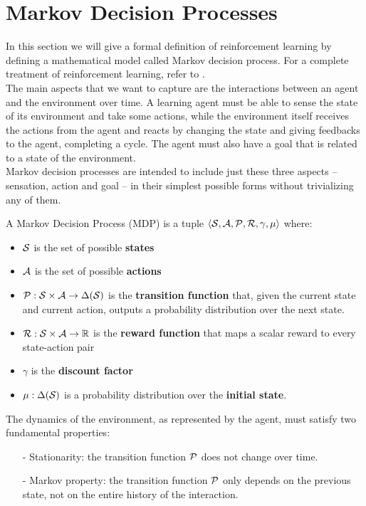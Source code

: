 \section{Markov Decision Processes}
\label{sec:mdp}
In this section we will give a formal definition of reinforcement learning by defining a mathematical model called Markov decision process. For a complete treatment of reinforcement learning, refer to \cite{sutton1998reinforcement}.\\
The main aspects that we want to capture are the interactions between an agent and the environment over time. A learning agent must be able to sense the state of its environment and take some actions, while the environment itself receives the actions from the agent and reacts by changing the state and giving feedbacks to the agent, completing a cycle.
The agent must also have a goal that is related to a state of the environment.\\
Markov decision processes are intended to include just these three aspects -- sensation, action and goal -- in their simplest possible forms without trivializing any of them.
\newpage
\begin{definition}
A Markov Decision Process (MDP) is a tuple $\left\langle \mathcal{S}, \mathcal{A}, \mathcal{P}, \mathcal{R}, \gamma, \mu \right\rangle$  where:
\begin{itemize}
\item $\mathcal{S}$ is the set of possible \textbf{states}
\item $\mathcal{A}$ is the set of possible \textbf{actions}
\item $\mathcal{P} : \mathcal{S} \times \mathcal{A} \rightarrow \Delta (\mathcal{S})$ is the \textbf{transition function} that, given the current state and current action, outputs a probability distribution over the next state.
\item $\mathcal{R} : \mathcal{S} \times \mathcal{A} \rightarrow \mathbb{R}$ is the \textbf{reward function} that maps a scalar reward to every state-action pair
\item $\gamma$ is the \textbf{discount factor}
\item $\mu : \Delta ( \mathcal{S} )$ is a probability distribution over the \textbf{initial state}. 
\end{itemize}
\end{definition}

The dynamics of the environment, as represented by the agent, must satisfy two fundamental properties:
\begin{itemize}
\item[-] Stationarity: the transition function $\mathcal{P}$ does not change over time.
\item[-] Markov property: the transition function $\mathcal{P}$ only depends on the previous state, not on the entire history of the interaction.
\end{itemize}

